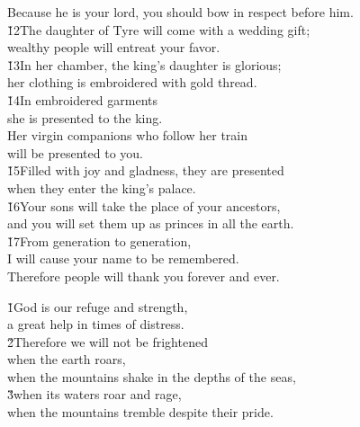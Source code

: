 \begin{poetry}
\poemll    Because he is your lord, you should bow in respect before him. \\
\poeml \v{12}The daughter of Tyre will come with a wedding gift; \\
\poemll    wealthy people will entreat your favor. \\
\poeml \v{13}In her chamber, the king's daughter is glorious; \\
\poemll    her clothing is embroidered with gold thread. \\
\poeml \v{14}In embroidered garments \\
\poemll    she is presented to the king. \\
\poeml Her virgin companions who follow her train \\
\poemll    will be presented to you. \\
\poeml \v{15}Filled with joy and gladness, they are presented \\
\poemll    when they enter the king's palace. \\
\poeml \v{16}Your sons will take the place of your ancestors, \\
\poemll    and you will set them up as princes in all the earth. \\
\poeml \v{17}From generation to generation, \\
\poemll    I will cause your name to be remembered. \\
\poemlll       Therefore people will thank you forever and ever.
\end{poetry}

\begin{poetry}
\poeml \v{1}God is our refuge and strength, \\
\poemll    a great help in times of distress. \\
\poeml \v{2}Therefore we will not be frightened \\
\poemll    when the earth roars, \\
\poeml when the mountains shake in the depths of the seas, \\
\poeml \v{3}when its waters roar and rage, \\
\poemlll       when the mountains tremble despite their pride.
\end{poetry}

